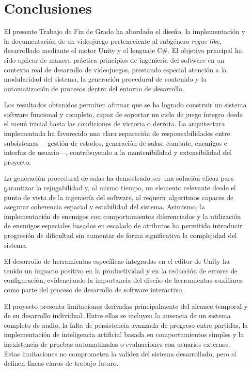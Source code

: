 \chapter{Conclusiones}

El presente Trabajo de Fin de Grado ha abordado el diseño, la implementación y la documentación de un videojuego perteneciente al subgénero \textit{rogue-like}, desarrollado mediante el motor Unity y el lenguaje C\#. El objetivo principal ha sido aplicar de manera práctica principios de ingeniería del software en un contexto real de desarrollo de videojuegos, prestando especial atención a la modularidad del sistema, la generación procedural de contenido y la automatización de procesos dentro del entorno de desarrollo.

Los resultados obtenidos permiten afirmar que se ha logrado construir un sistema software funcional y completo, capaz de soportar un ciclo de juego íntegro desde el menú inicial hasta las condiciones de victoria o derrota. La arquitectura implementada ha favorecido una clara separación de responsabilidades entre subsistemas —gestión de estados, generación de salas, combate, enemigos e interfaz de usuario—, contribuyendo a la mantenibilidad y extensibilidad del proyecto.

La generación procedural de salas ha demostrado ser una solución eficaz para garantizar la rejugabilidad y, al mismo tiempo, un elemento relevante desde el punto de vista de la ingeniería del software, al requerir algoritmos capaces de asegurar coherencia espacial y estabilidad del sistema. Asimismo, la implementación de enemigos con comportamientos diferenciados y la utilización de enemigos especiales basados en escalado de atributos ha permitido introducir progresión de dificultad sin aumentar de forma significativa la complejidad del sistema.

El desarrollo de herramientas específicas integradas en el editor de Unity ha tenido un impacto positivo en la productividad y en la reducción de errores de configuración, evidenciando la importancia del diseño de herramientas auxiliares como parte del proceso de desarrollo de software interactivo.

El proyecto presenta limitaciones derivadas principalmente del alcance temporal y de su desarrollo individual. Entre ellas se incluyen la ausencia de un sistema completo de audio, la falta de persistencia avanzada de progreso entre partidas, la implementación de inteligencia artificial basada en comportamientos simples y la inexistencia de pruebas automatizadas o evaluaciones con usuarios externos. Estas limitaciones no comprometen la validez del sistema desarrollado, pero sí definen líneas claras de trabajo futuro.

